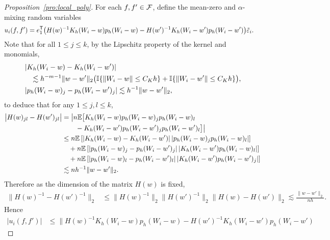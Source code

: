 \begin{proof}[Proposition~\ref{pro:local_poly}]
  For each $f, f' \in \mathcal{F}$,
  define the mean-zero and $\alpha$-mixing random variables
  \begin{align*}
    u_i(f,f')
    &=
    e_1^{\mathsf{T}}
    \big(
      H(w)^{-1} K_h(W_i-w) p_h(W_i-w)
      - H(w')^{-1} K_h(W_i-w') p_h(W_i-w')
    \big)
    \tilde\varepsilon_i.
  \end{align*}
  Note that for all $1 \leq j \leq k$,
  by the Lipschitz property of the kernel and monomials,
  \begin{align*}
    &\left|
    K_h(W_i-w) - K_h(W_i-w')
    \right| \\
    &\quad\lesssim
    h^{-m-1}
    \|w-w'\|_2
    \big(
      \mathbb{I}\{\|W_i-w\| \leq C_K h\}
      + \mathbb{I}\{\|W_i-w'\| \leq C_K h\}
    \big), \\
    &\left|
    p_h(W_i-w)_j - p_h(W_i-w')_j
    \right|
    \lesssim
    h^{-1}
    \|w-w'\|_2,
  \end{align*}
  to deduce that for any $1 \leq j,l \leq k$,
  \begin{align*}
    \big| H(w)_{j l} - H(w')_{j l} \big|
    &=
    \big|
    n \mathbb{E}\big[
      K_h(W_i-w) p_h(W_i-w)_j p_h(W_i-w)_l \\
      &\qquad-
      K_h(W_i-w') p_h(W_i-w')_j p_h(W_i-w')_l
    \big]
    \big| \\
    &\leq
    n\mathbb{E}\left[
      \left|
      K_h(W_i-w) - K_h(W_i-w')
      \right|
      \left|
      p_h(W_i-w)_j
      p_h(W_i-w)_l
      \right|
    \right] \\
    &\quad+
    n\mathbb{E}\left[
      \left|
      p_h(W_i-w)_j - p_h(W_i-w')_j
      \right|
      \left|
      K_h(W_i-w')
      p_h(W_i-w)_l
      \right|
    \right] \\
    &\quad+
    n\mathbb{E}\left[
      \left|
      p_h(W_i-w)_l - p_h(W_i-w')_l
      \right|
      \left|
      K_h(W_i-w')
      p_h(W_i-w')_j
      \right|
    \right] \\
    &\lesssim
    n h^{-1}\|w-w'\|_2.
  \end{align*}
  Therefore as the dimension of the matrix $H(w)$ is fixed,
  \begin{align*}
    \big\| H(w)^{-1} - H(w')^{-1} \big\|_2
    &\leq
    \big\| H(w)^{-1}\big\|_2
    \big\| H(w')^{-1}\big\|_2
    \big\| H(w) - H(w') \big\|_2
    \lesssim
    \frac{\|w-w'\|_2}{n h}.
  \end{align*}
  Hence
  \begin{align*}
    \big| u_i(f,f') \big|
    &\leq
    \big\|
    H(w)^{-1} K_h(W_i-w) p_h(W_i-w)
    - H(w')^{-1} K_h(W_i-w') p_h(W_i-w')

\end{align*}
\end{proof}
